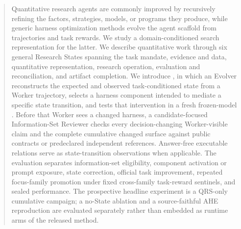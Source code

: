 \begin{abstract}
Quantitative research agents are commonly improved by recursively refining the
factors, strategies, models, or programs they produce, while generic harness
optimization methods evolve the agent scaffold from trajectories and task
rewards. We study a domain-conditioned search representation for the latter.
We describe quantitative work through six general Research States spanning the
task mandate, evidence and data, quantitative representation, research
operation, evaluation and reconciliation, and artifact completion. We
introduce \method{}, in which an Evolver reconstructs the expected and observed
task-conditioned state from a Worker trajectory, selects a harness component
intended to mediate a specific state transition, and tests that intervention in
    a fresh frozen-model \worker{}. Before that Worker sees a changed harness,
a candidate-focused Information-Set Reviewer checks every decision-changing
Worker-visible claim and the complete cumulative changed surface against public
contracts or predeclared independent references. Answer-free executable
relations serve as state-transition observations when applicable. The
evaluation separates
information-set eligibility, component activation or prompt exposure, state
correction, official task improvement, repeated focus-family promotion under
fixed cross-family task-reward sentinels, and sealed performance. The
prospective headline experiment is a QRS-only
cumulative campaign; a no-State ablation and a source-faithful AHE reproduction
are evaluated separately rather than embedded as runtime arms of the released
method. 
\end{abstract}
